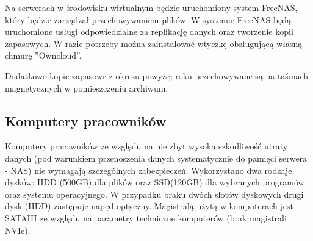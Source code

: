 Na serwerach w środowisku wirtualnym będzie uruchomiony system FreeNAS, który będzie zarządzał przechowywaniem plików. W systemie FreeNAS będą uruchomione usługi odpowiedzialne za replikację danych oraz tworzenie kopii zapasowych. W razie potrzeby można zainstalować wtyczkę obsługującą własną chmurę ''Owncloud''.

Dodatkowo kopie zapasowe z okresu powyżej roku przechowywane są na taśmach magnetycznych w pomieszczeniu archiwum.

\subsection{Komputery pracowników}
Komputery pracowników ze względu na nie zbyt wysoką szkodliwość utraty danych (pod warunkiem przenoszenia danych systematycznie do pamięci serwera - NAS) nie wymagają szczególnych zabezpieczeń. Wykorzystano dwa rodzaje dysków: HDD (500GB) dla plików oraz SSD(120GB) dla wybranych programów oraz systemu operacyjnego. W przypadku braku dwóch slotów dyskowych drugi dysk (HDD) zastępuje napęd optyczny. Magistralą użytą w komputerach jest SATAIII ze względu na parametry techniczne komputerów (brak magistrali NVIe).